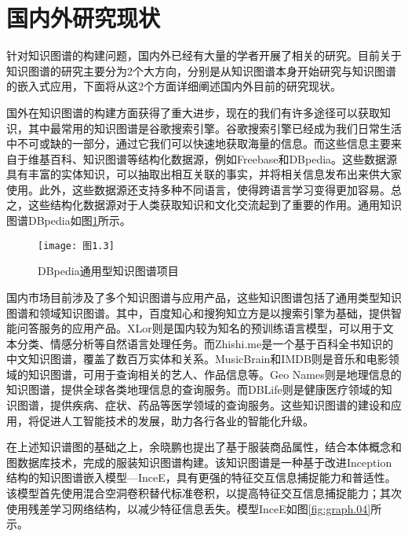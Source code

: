 \documentclass[bachelor_p]{hdu-thesis}
\begin{document}
\section{国内外研究现状}

针对知识图谱的构建问题，国内外已经有大量的学者开展了相关的研究。目前关于知识图谱的研究主要分为2个大方向，分别是从知识图谱本身开始研究与知识图谱的嵌入式应用，下面将从这2个方面详细阐述国内外目前的研究现状。


国外在知识图谱的构建方面获得了重大进步，现在的我们有许多途径可以获取知识，其中最常用的知识图谱是谷歌搜索引擎\cite{book3}。谷歌搜索引擎已经成为我们日常生活中不可或缺的一部分，通过它我们可以快速地获取海量的信息。而这些信息主要来自于维基百科、知识图谱等结构化数据源，例如Freebase和DBpedia\cite{article4}。这些数据源具有丰富的实体知识，可以抽取出相互关联的事实，并将相关信息发布出来供大家使用。此外，这些数据源还支持多种不同语言，使得跨语言学习变得更加容易。总之，这些结构化数据源对于人类获取知识和文化交流起到了重要的作用。通用知识图谱DBpedia如图\ref{fig:graph.03}所示。

\begin{figure}[h]
  \centering
  \texttt{[image: 图1.3]}
  \caption{DBpedia通用型知识图谱项目} \label{fig:graph.03}
\end{figure}

国内市场目前涉及了多个知识图谱与应用产品，这些知识图谱包括了通用类型知识图谱和领域知识图谱。其中，百度知心和搜狗知立方是以搜索引擎为基础，提供智能问答服务的应用产品。XLor\cite{article5}则是国内较为知名的预训练语言模型，可以用于文本分类、情感分析等自然语言处理任务。而Zhishi.me\cite{book6}是一个基于百科全书知识的中文知识图谱，覆盖了数百万实体和关系。MusicBrain\cite{inproceedings7}和IMDB\cite{article9}则是音乐和电影领域的知识图谱，可用于查询相关的艺人、作品信息等。Geo Names\cite{article8}则是地理信息的知识图谱，提供全球各类地理信息的查询服务。而DBLife\cite{inproceedings10}则是健康医疗领域的知识图谱，提供疾病、症状、药品等医学领域的查询服务。这些知识图谱的建设和应用，将促进人工智能技术的发展，助力各行各业的智能化升级。

在上述知识谱图的基础之上，余晓鹏也提出了基于服装商品属性，结合本体概念和图数据库技术，完成的服装知识图谱构建。该知识图谱是一种基于改进Inception结构的知识图谱嵌入模型—InceE\cite{mastersthesis11}，具有更强的特征交互信息捕捉能力和普适性。该模型首先使用混合空洞卷积替代标准卷积，以提高特征交互信息捕捉能力；其次使用残差学习网络结构，以减少特征信息丢失。模型InceE如图\ref{fig:graph.04}所示。
\end{document}
